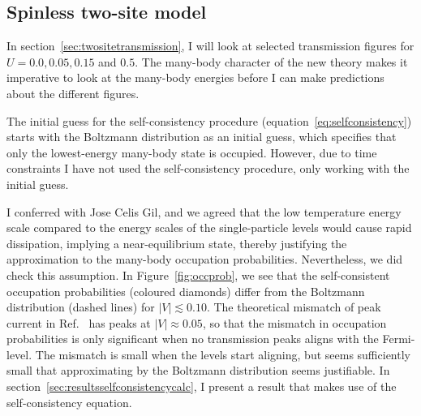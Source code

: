 \subsection{Spinless two-site model}
In section~\ref{sec:twositetransmission}, I will look at selected transmission figures for $U=0.0, 0.05, 0.15$ and $0.5$. The many-body character of the new theory makes it imperative to look at the many-body energies before I can make predictions about the different figures.

The initial guess for the self-consistency procedure (equation~\ref{eq:selfconsistency}) starts with the Boltzmann distribution as an initial guess, which specifies that only the lowest-energy many-body state is occupied. However, due to time constraints I have not used the self-consistency procedure, only working with the initial guess.

I conferred with Jose Celis Gil, and we agreed that the low temperature energy scale compared to the energy scales of the single-particle levels would cause rapid dissipation, implying a near\hyp{}equilibrium state, thereby justifying the approximation to the many-body occupation probabilities. Nevertheless, we did check this assumption. In Figure~\ref{fig:occprob}, we see that the self-consistent occupation probabilities (coloured diamonds) differ from the Boltzmann distribution (dashed lines) for $\left|V\right|\lesssim 0.10$. The theoretical mismatch of peak current in Ref.~\cite{perrinnano} has peaks at $\left|V\right|\approx 0.05$, so that the mismatch in occupation probabilities is only significant when no transmission peaks aligns with the Fermi-level. The mismatch is small when the levels start aligning, but seems sufficiently small that approximating by the Boltzmann distribution seems justifiable. In section~\ref{sec:resultsselfconsistencycalc}, I present a result that makes use of the self-consistency equation.

